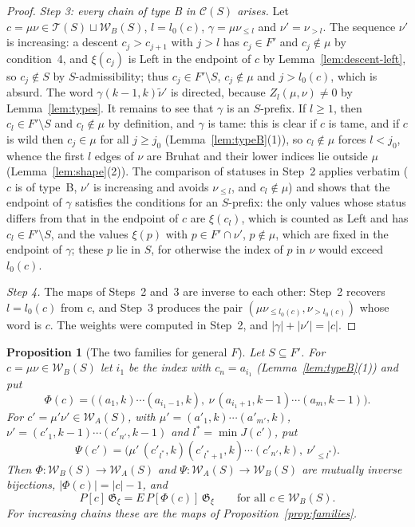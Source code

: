 \documentclass[11pt]{article}
\newtheorem{proposition}{Proposition}
\newcommand{\G}{\mathfrak{G}}
\begin{document}
\begin{proof}
\emph{Step 3: every chain of type B in $\mathcal C(S)$ arises.} Let
$c=\mu\nu\in\mathcal T(S)\sqcup\mathcal W_B(S)$, $l=l_0(c)$,
$\gamma=\mu\nu_{\leq l}$ and $\nu'=\nu_{>l}$. The sequence $\nu'$ is
increasing: a descent $c_j>c_{j+1}$ with $j>l$ has $c_j\in F'$ and
$c_j\notin\mu$ by condition~4, and $\xi(c_j)$ is Left in the endpoint
of $c$ by Lemma~\ref{lem:descent-left}, so $c_j\notin S$ by
$S$-admissibility; thus $c_j\in F'\setminus S$, $c_j\notin\mu$ and
$j>l_0(c)$, which is absurd. The word $\gamma(k-1,k)\tilde\nu'$ is
directed, because $Z_l(\mu,\nu)\neq0$ by Lemma~\ref{lem:types}. It
remains to see that $\gamma$ is an $S$-prefix. If $l\geq1$, then
$c_l\in F'\setminus S$ and $c_l\notin\mu$ by definition, and $\gamma$
is tame: this is clear if $c$ is tame, and if $c$ is wild then
$c_j\in\mu$ for all $j\geq j_0$ (Lemma~\ref{lem:typeB}(1)), so
$c_l\notin\mu$ forces $l<j_0$, whence the first $l$ edges of $\nu$ are
Bruhat and their lower indices lie outside $\mu$
(Lemma~\ref{lem:shape}(2)). The comparison of statuses in
Step~2 applies verbatim ($c$ is of type~B, $\nu'$ is increasing and
avoids $\nu_{\leq l}$, and $c_l\notin\mu$) and shows that the
endpoint of $\gamma$ satisfies the conditions for an $S$-prefix: the
only values whose status differs from that in the endpoint of $c$ are
$\xi(c_l)$, which is counted as Left and has $c_l\in F'\setminus S$,
and the values $\xi(p)$ with $p\in F'\cap\nu'$, $p\notin\mu$, which
are fixed in the endpoint of $\gamma$; these $p$ lie in $S$, for
otherwise the index of $p$ in $\nu$ would exceed $l_0(c)$.

\emph{Step 4.} The maps of Steps~2 and~3 are inverse to each other:
Step~2 recovers $l=l_0(c)$ from $c$, and Step~3 produces the pair
$(\mu\nu_{\leq l_0(c)},\nu_{>l_0(c)})$ whose word is $c$. The weights
were computed in Step~2, and $|\gamma|+|\nu'|=|c|$.
\end{proof}

\begin{proposition}[The two families for general $F$]\label{prop:families-general}
Let $S\subseteq F'$. For $c=\mu\nu\in\mathcal W_B(S)$ let $i_1$ be
the index with $c_n=a_{i_1}$ (Lemma~\ref{lem:typeB}(1)) and put
\[
 \Phi(c)=\bigl((a_1,k)\cdots(a_{i_1-1},k),\
  \nu\,(a_{i_1+1},k-1)\cdots(a_m,k-1)\bigr).
\]
For $c'=\mu'\nu'\in\mathcal W_A(S)$, with
$\mu'=(a'_1,k)\cdots(a'_{m'},k)$, $\nu'=(c'_1,k-1)\cdots(c'_{n'},k-1)$
and $l^\ast=\min J(c')$, put
\[
 \Psi(c')=\bigl(\mu'\,(c'_{l^\ast},k)(c'_{l^\ast+1},k)\cdots(c'_{n'},k),\
  \nu'_{\leq l^\ast}\bigr).
\]
Then $\Phi\colon\mathcal W_B(S)\to\mathcal W_A(S)$ and
$\Psi\colon\mathcal W_A(S)\to\mathcal W_B(S)$ are mutually inverse
bijections, $|\Phi(c)|=|c|-1$, and
\[
 P[c]\,\G_\xi=E\,P[\Phi(c)]\,\G_\xi\qquad\text{for all }c\in\mathcal W_B(S).
\]
For increasing chains these are the maps of
Proposition~\ref{prop:families}.
\end{proposition}
\end{document}
